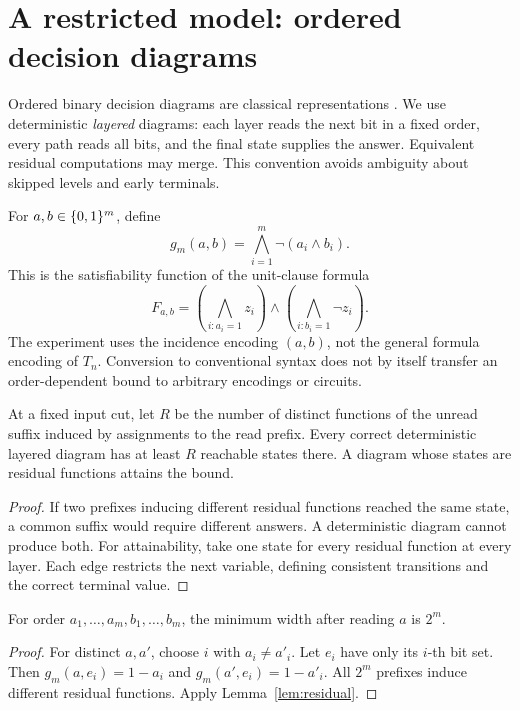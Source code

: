 \section{A restricted model: ordered decision diagrams}
Ordered binary decision diagrams are classical representations
\cite{Bryant1986}. We use deterministic \emph{layered} diagrams:
each layer reads the next bit in a fixed order, every path reads
all bits, and the final state supplies the answer. Equivalent
residual computations may merge. This convention avoids ambiguity
about skipped levels and early terminals.

For \(a,b\in\{0,1\}^m\), define
\[
 g_m(a,b)=\bigwedge_{i=1}^m\neg(a_i\land b_i).
\]
This is the satisfiability function of the unit-clause formula
\[
 F_{a,b}=
 \left(\bigwedge_{i:a_i=1}z_i\right)\land
 \left(\bigwedge_{i:b_i=1}\neg z_i\right).
\]
The experiment uses the incidence encoding \((a,b)\), not the
general formula encoding of \(T_n\). Conversion to conventional
syntax does not by itself transfer an order-dependent bound to
arbitrary encodings or circuits.

\begin{lemma}
\label{lem:residual}
At a fixed input cut, let \(R\) be the number of distinct functions
of the unread suffix induced by assignments to the read prefix.
Every correct deterministic layered diagram has at least \(R\)
reachable states there. A diagram whose states are residual
functions attains the bound.
\end{lemma}
\begin{proof}
If two prefixes inducing different residual functions reached the
same state, a common suffix would require different answers. A
deterministic diagram cannot produce both. For attainability, take
one state for every residual function at every layer. Each edge
restricts the next variable, defining consistent transitions and
the correct terminal value.
\end{proof}

\begin{proposition}
\label{prop:grouped}
For order \(a_1,\ldots,a_m,b_1,\ldots,b_m\), the minimum width
after reading \(a\) is \(2^m\).
\end{proposition}
\begin{proof}
For distinct \(a,a'\), choose \(i\) with \(a_i\ne a'_i\).
Let \(e_i\) have only its \(i\)-th bit set. Then
\(g_m(a,e_i)=1-a_i\) and \(g_m(a',e_i)=1-a'_i\).
All \(2^m\) prefixes induce different residual functions.
Apply Lemma~\ref{lem:residual}.
\end{proof}

